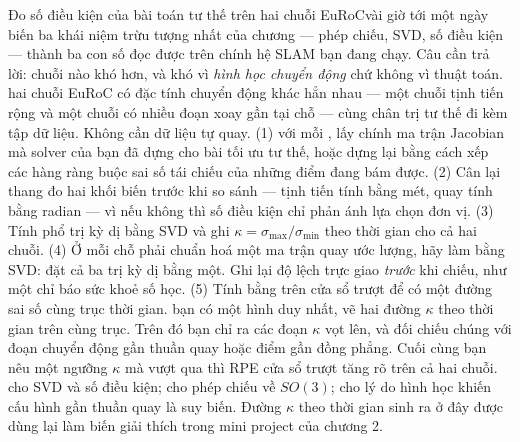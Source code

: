 \documentclass[../../deep_learning.tex]{subfiles}
\begin{document}
\begin{duan}{Đo số điều kiện của bài toán tư thế trên hai chuỗi EuRoC}{vài giờ tới một ngày}
\dmt biến ba khái niệm trừu tượng nhất của chương --- phép chiếu, SVD, số điều kiện --- thành ba con số đọc được trên chính hệ SLAM bạn đang chạy. Câu cần trả lời: chuỗi nào khó hơn, và khó vì \emph{hình học chuyển động} chứ không vì thuật toán.
\ddl hai chuỗi EuRoC có đặc tính chuyển động khác hẳn nhau --- một chuỗi tịnh tiến rộng và một chuỗi có nhiều đoạn xoay gần tại chỗ --- cùng chân trị tư thế đi kèm tập dữ liệu. Không cần dữ liệu tự quay.
\dbc (1) với mỗi , lấy chính ma trận Jacobian mà solver của bạn đã dựng cho bài tối ưu tư thế, hoặc dựng lại bằng cách xếp các hàng ràng buộc sai số tái chiếu của những điểm đang bám được. (2) Cân lại thang đo hai khối biến trước khi so sánh --- tịnh tiến tính bằng mét, quay tính bằng radian --- vì nếu không thì số điều kiện chỉ phản ánh lựa chọn đơn vị. (3) Tính phổ trị kỳ dị bằng SVD và ghi \(\kappa=\sigma_{\max}/\sigma_{\min}\) theo thời gian cho cả hai chuỗi. (4) Ở mỗi chỗ phải chuẩn hoá một ma trận quay ước lượng, hãy làm bằng SVD: đặt cả ba trị kỳ dị bằng một. Ghi lại độ lệch trực giao \emph{trước} khi chiếu, như một chỉ báo sức khoẻ số học. (5) Tính  bằng  trên cửa sổ trượt để có một đường sai số cùng trục thời gian.
\dxk bạn có một hình duy nhất, vẽ hai đường \(\kappa\) theo thời gian trên cùng trục. Trên đó bạn chỉ ra các đoạn \(\kappa\) vọt lên, và đối chiếu chúng với đoạn chuyển động gần thuần quay hoặc điểm gần đồng phẳng. Cuối cùng bạn nêu một ngưỡng \(\kappa\) mà vượt qua thì RPE cửa sổ trượt tăng rõ trên cả hai chuỗi.
\dnv {} cho SVD và số điều kiện;  cho phép chiếu về \(SO(3)\);  cho lý do hình học khiến cấu hình gần thuần quay là suy biến. Đường \(\kappa\) theo thời gian sinh ra ở đây được dùng lại làm biến giải thích trong mini project của chương 2.
\end{duan}

\begin{traloi}
\end{traloi}
\end{document}
